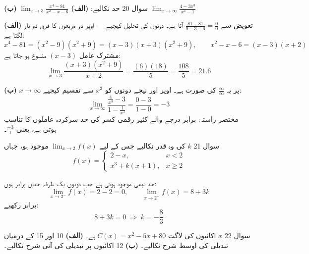 \begin{sawal}{سوال \textenglish{20}}
حد نکالیے: \quad
\textbf{(الف)} \(\displaystyle\lim_{x\to 3}\frac{x^{4}-81}{x^{2}-x-6}\) \qquad
\textbf{(ب)} \(\displaystyle\lim_{x\to \infty}\frac{4-3x^{3}}{x^{3}-1}\)
\end{sawal}

\begin{hal}
\textbf{(الف)} تعویض سے \(\tfrac{81-81}{9-3-6}=\tfrac00\) آتا ہے۔ دونوں کی
تحلیل کیجیے --- اوپر دو مربعوں کا فرق دو بار لگتا ہے:
\[
x^{4}-81=(x^{2}-9)(x^{2}+9)=(x-3)(x+3)(x^{2}+9),
\qquad
x^{2}-x-6=(x-3)(x+2)
\]
مشترک عامل \((x-3)\) منسوخ ہو جاتا ہے:
\[
\lim_{x\to3}\frac{(x+3)(x^{2}+9)}{x+2}=\frac{(6)(18)}{5}=\frac{108}{5}=21.6
\]

\medskip
\textbf{(ب)} \(x\to\infty\) پر یہ \(\tfrac{\infty}{\infty}\) کی صورت ہے۔ اوپر
اور نیچے دونوں کو \(x^{3}\) سے تقسیم کیجیے:
\[
\lim_{x\to\infty}\frac{\tfrac{4}{x^{3}}-3}{1-\tfrac{1}{x^{3}}}
=\frac{0-3}{1-0}=-3
\]
مختصر راستہ: برابر درجے والے کثیر رقمی کسر کی حد سرکردہ عاملوں کا تناسب ہوتی
ہے، یعنی \(\tfrac{-3}{1}\)۔

\end{hal}

\begin{sawal}{سوال \textenglish{21}}
\(k\) کی وہ قدر نکالیے جس کے لیے \(\displaystyle\lim_{x\to 2}f(x)\) موجود ہو،
جہاں
\[
f(x)=\begin{cases} 2-x, & x<2\\[2pt] x^{3}+k(x+1), & x\ge 2\end{cases}
\]
\end{sawal}

\begin{hal}
حد تبھی موجود ہوتی ہے جب دونوں یک طرفہ حدیں برابر ہوں:
\[
\lim_{x\to2^{-}}f(x)=2-2=0,
\qquad
\lim_{x\to2^{+}}f(x)=8+3k
\]
برابر رکھیے:
\[
8+3k=0 \;\Longrightarrow\; k=-\frac83
\]

\end{hal}

\begin{sawal}{سوال \textenglish{22}}
\(x\) اکائیوں کی لاگت \(C(x)=x^{2}-5x+80\) ہے۔
\textbf{(الف)} \textenglish{10} اور \textenglish{15} کے درمیان تبدیلی کی اوسط
شرح نکالیے۔
\textbf{(ب)} \textenglish{12} اکائیوں پر تبدیلی کی آنی شرح نکالیے۔
\end{sawal}

